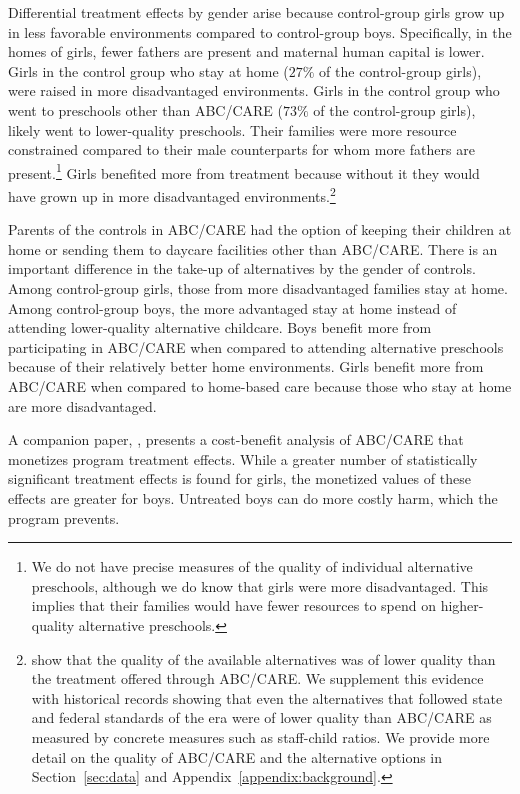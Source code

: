 Differential treatment effects by gender arise because control-group girls grow up in less favorable environments compared to control-group boys. Specifically, in the homes of girls, fewer fathers are present and maternal human capital is lower. Girls in the control group who stay at home ($27\%$ of the control-group girls), were raised in more disadvantaged environments. Girls in the control group who went to preschools other than ABC/CARE ($73\%$ of the control-group girls), likely went to lower-quality preschools. Their families were more resource constrained compared to their male counterparts for whom more fathers are present.\footnote{We do not have precise measures of the quality of individual alternative preschools, although we do know that girls were more disadvantaged. This implies that their families would have fewer resources to spend on higher-quality alternative preschools.} Girls benefited more from treatment because without it they would have grown up in more disadvantaged environments.\footnote{\citet{Burchinal_etal_1989_CD_Daycare-Pre-K-Dev} show that the quality of the available alternatives was of lower quality than the treatment offered through ABC/CARE. We supplement this evidence with historical records showing that even the alternatives that followed state and federal standards of the era were of lower quality than ABC/CARE as measured by concrete measures such as staff-child ratios. We provide more detail on the quality of ABC/CARE and the alternative options in Section~\ref{sec:data} and Appendix~\ref{appendix:background}.}

Parents of the controls in ABC/CARE had the option of keeping their children at home or sending them to daycare facilities other than ABC/CARE. There is an important difference in the take-up of alternatives by the gender of controls. Among control-group girls, those from more disadvantaged families stay at home. Among control-group boys, the more advantaged stay at home instead of attending lower-quality alternative childcare. Boys benefit more from participating in ABC/CARE when compared to attending alternative preschools because of their relatively better home environments. Girls benefit more from ABC/CARE when compared to home-based care because those who stay at home are more disadvantaged.

A companion paper, \citet{Garcia_Heckman_Leaf_etal_2017_Comp_CBA_Unpublished}, presents a cost-benefit analysis of ABC/CARE that monetizes program treatment effects. While a greater number of statistically significant treatment effects is found for girls, the monetized values of these effects are greater for boys. Untreated boys can do more costly harm, which the program prevents.


